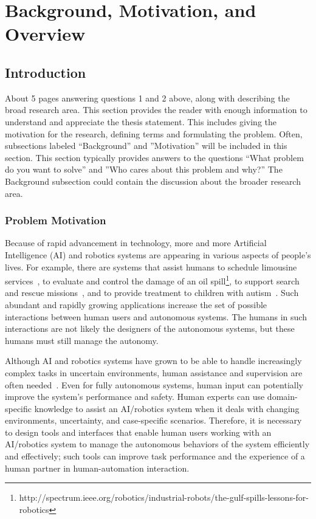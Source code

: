 \chapter{Background, Motivation, and Overview}
\label{chap:intro}

\section{Introduction}
\label{intro}
About 5 pages answering questions 1 and 2 above, along with describing the broad research area. This section provides the reader with enough information to understand and appreciate the thesis statement. This includes giving the motivation for the research, defining terms and formulating the problem. Often, subsections labeled ``Background'' and ''Motivation'' will be included in this section. This section typically provides answers to the questions ``What problem do you want to solve'' and ''Who cares about this problem and why?'' The Background subsection could contain the discussion about the broader research area.

\subsection{Problem Motivation}
\label{motivation}

Because of rapid advancement in technology, more and more Artificial Intelligence (AI) and robotics systems are appearing in various aspects of people's lives. For example, there are systems that assist humans to schedule limousine services~\cite{Chun2010Limousine}, to evaluate and control the damage of an oil spill\footnote{http://spectrum.ieee.org/robotics/industrial-robots/the-gulf-spills-lessons-for-robotics}, to support search and rescue missions~\cite{Casper2003Human,Lin2010Supporting}, and to provide treatment to children with autism~\cite{Robins2009From}. Such abundant and rapidly growing applications increase the set of possible interactions between human users and autonomous systems. The humans in such interactions are not likely the designers of the autonomous systems, but these humans must still manage the autonomy.

Although AI and robotics systems have grown to be able to handle increasingly complex tasks in uncertain environments, human assistance and supervision are often needed~\cite{Bainbridge1983Ironies}. Even for fully autonomous systems, human input can potentially improve the system's performance and safety. Human experts can use domain-specific knowledge to assist an AI/robotics system when it deals with changing environments, uncertainty, and case-specific scenarios. Therefore, it is necessary to design tools and interfaces that enable human users working with an AI/robotics system to manage the autonomous behaviors of the system efficiently and effectively; such tools can improve task performance and the experience of a human partner in human-automation interaction. 

